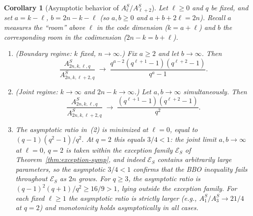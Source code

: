 \documentclass[11pt]{article}
\theoremstyle{plain}
\newtheorem{corollary}[theorem]{Corollary}
\theoremstyle{remark}
\begin{document}
\begin{corollary}[Asymptotic behavior of $A^S_\ell / A^S_{\ell+2}$]\label{cor:alpha-symp-asym}
Let $\ell \geq 0$ and $q$ be fixed, and set $a = k - \ell$, $b = 2n - k - \ell$
(so $a, b \geq 0$ and $a + b + 2\ell = 2n$). Recall $a$ measures the
``room'' above $\ell$ in the code dimension ($k = a + \ell$) and $b$ the
corresponding room in the codimension ($2n - k = b + \ell$).
\begin{enumerate}
\item (\emph{Boundary regime: $k$ fixed, $n \to \infty$.})
Fix $a \geq 2$ and let $b \to \infty$. Then
\[
  \frac{A^S_{2n,k,\ell,q}}{A^S_{2n,k,\ell+2,q}}
  \;\longrightarrow\; \frac{q^{a-2}(q^{\ell+1}-1)(q^{\ell+2}-1)}{q^a - 1}.
\]
\item (\emph{Joint regime: $k \to \infty$ and $2n - k \to \infty$.})
Let $a, b \to \infty$ simultaneously. Then
\[
  \frac{A^S_{2n,k,\ell,q}}{A^S_{2n,k,\ell+2,q}}
  \;\longrightarrow\; \frac{(q^{\ell+1}-1)(q^{\ell+2}-1)}{q^2}.
\]
\item The asymptotic ratio in~(2) is minimized at $\ell = 0$, equal to
$(q-1)(q^2-1)/q^2$. At $q = 2$ this equals $3/4 < 1$: the joint limit
$a, b \to \infty$ at $\ell = 0$, $q = 2$ is taken within the exception
family $\mathcal{E}_S$ of Theorem~\ref{thm:exception-symp}, and indeed
$\mathcal{E}_S$ contains arbitrarily large parameters, so the asymptotic
$3/4 < 1$ confirms that the BBO inequality fails throughout $\mathcal{E}_S$
as $2n$ grows. For $q \geq 3$, the asymptotic ratio is
$(q-1)^2(q+1)/q^2 \geq 16/9 > 1$, lying outside the exception family.
For each fixed $\ell \geq 1$ the asymptotic ratio is strictly larger (e.g.,
$A^S_1/A^S_3 \to 21/4$ at $q = 2$) and monotonicity holds asymptotically
in all cases.
\end{enumerate}
\end{corollary}
\end{document}
